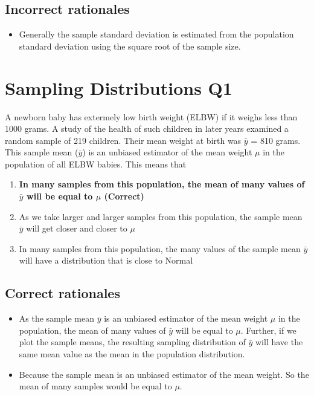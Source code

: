 \documentclass[letterpaper,12pt,twoside,printwatermark=false]{pinp}
\providecommand{\tightlist}{%
  \setlength{\itemsep}{0pt}\setlength{\parskip}{0pt}}
\begin{document}
\hypertarget{incorrect-rationales}{%
\subsection{Incorrect rationales}\label{incorrect-rationales}}

\begin{itemize}
\tightlist
\item
  Generally the sample standard deviation is estimated from the
  population standard deviation using the square root of the sample
  size.
\end{itemize}

\hypertarget{sampling-distributions-q1}{%
\section{Sampling Distributions Q1}\label{sampling-distributions-q1}}

A newborn baby has extermely low birth weight (ELBW) if it weighs less
than 1000 grams. A study of the health of such children in later years
examined a random sample of 219 children. Their mean weight at birth was
\(\bar{y}\) = 810 grams. This sample mean (\(\bar{y}\)) is an unbiased
estimator of the mean weight \(\mu\) in the population of all ELBW
babies. This means that

\begin{enumerate}
\def\labelenumi{\alph{enumi})}
\tightlist
\item
  \textbf{In many samples from this population, the mean of many values
  of \(\bar{y}\) will be equal to \(\mu\) (Correct)}
\item
  As we take larger and larger samples from this population, the sample
  mean \(\bar{y}\) will get closer and closer to \(\mu\)
\item
  In many samples from this population, the many values of the sample
  mean \(\bar{y}\) will have a distribution that is close to Normal
\end{enumerate}

\hypertarget{correct-rationales-1}{%
\subsection{Correct rationales}\label{correct-rationales-1}}

\begin{itemize}
\tightlist
\item
  As the sample mean \(\bar{y}\) is an unbiased estimator of the mean
  weight \(\mu\) in the population, the mean of many values of
  \(\bar{y}\) will be equal to \(\mu\). Further, if we plot the sample
  means, the resulting sampling distribution of \(\bar{y}\) will have
  the same mean value as the mean in the population distribution.
\item
  Because the sample mean is an unbiased estimator of the mean weight.
  So the mean of many samples would be equal to \(\mu\).
\end{itemize}
\end{document}
